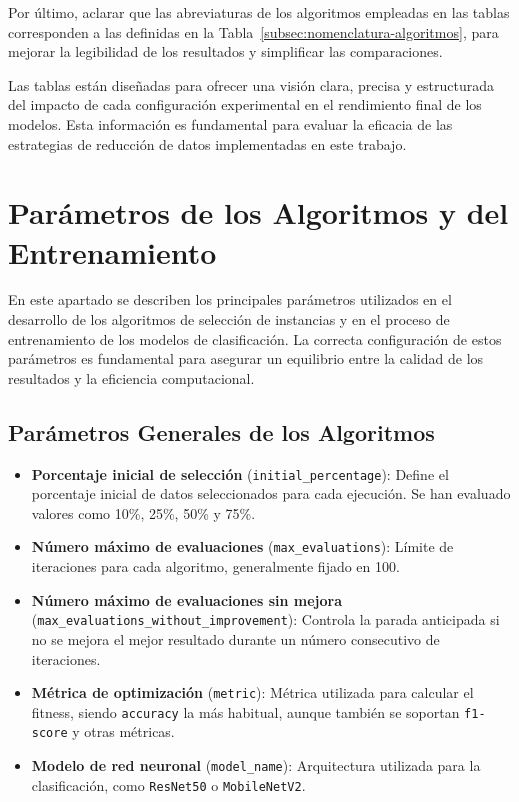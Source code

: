 Por último, aclarar que las abreviaturas de los algoritmos empleadas en las tablas corresponden a las definidas en la Tabla~\ref{subsec:nomenclatura-algoritmos},
para mejorar la legibilidad de los resultados y simplificar las comparaciones.

Las tablas están diseñadas para ofrecer una visión clara, precisa y estructurada del impacto de cada configuración experimental en el rendimiento final de los modelos.
Esta información es fundamental para evaluar la eficacia de las estrategias de reducción de datos implementadas en este trabajo.


\section{Parámetros de los Algoritmos y del Entrenamiento}\label{subsec:parametros-algoritmos}
En este apartado se describen los principales parámetros utilizados en el desarrollo de los algoritmos de
selección de instancias y en el proceso de entrenamiento de los modelos de clasificación.
La correcta configuración de estos parámetros es fundamental para asegurar un equilibrio entre la calidad de los resultados y la eficiencia computacional.

\subsection{Parámetros Generales de los Algoritmos}\label{subsec:parametros-generales-algoritmos}
\begin{itemize}
    \item \textbf{Porcentaje inicial de selección} (\texttt{initial\_percentage}): Define el porcentaje inicial de datos seleccionados para cada ejecución.
          Se han evaluado valores como 10\%, 25\%, 50\% y 75\%.
    \item \textbf{Número máximo de evaluaciones} (\texttt{max\_evaluations}): Límite de iteraciones para cada algoritmo, generalmente fijado en 100.
    \item \textbf{Número máximo de evaluaciones sin mejora} \\(\texttt{max\_evaluations\_without\_improvement}):
          Controla la parada anticipada si no se mejora el mejor resultado durante un número consecutivo de iteraciones.
    \item \textbf{Métrica de optimización} (\texttt{metric}): Métrica utilizada para calcular el fitness,
          siendo \texttt{accuracy} la más habitual, aunque también se soportan \texttt{f1-score} y otras métricas.
    \item \textbf{Modelo de red neuronal} (\texttt{model\_name}): Arquitectura utilizada para la clasificación, como \texttt{ResNet50} o \texttt{MobileNetV2}.
\end{itemize}

